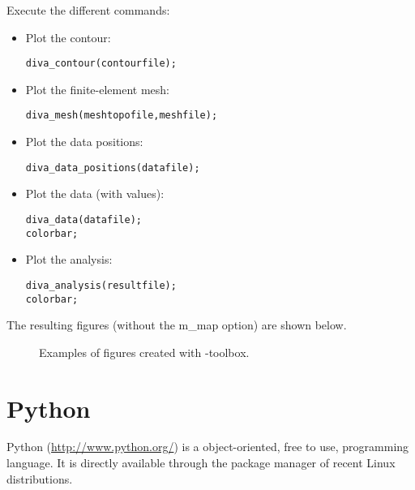 Execute the different commands:
\begin{itemize}
\item Plot the contour:
\begin{lstlisting}[style=Matlab]
diva_contour(contourfile);
\end{lstlisting}

\item Plot the finite-element mesh:
\begin{lstlisting}[style=Matlab]
diva_mesh(meshtopofile,meshfile);
\end{lstlisting}


\item Plot the data positions:
\begin{lstlisting}[style=Matlab]
diva_data_positions(datafile);
\end{lstlisting}

\item Plot the data (with values):
\begin{lstlisting}[style=Matlab]
diva_data(datafile);
colorbar;
\end{lstlisting}

\item Plot the analysis:
\begin{lstlisting}[style=Matlab]
diva_analysis(resultfile);
colorbar;
\end{lstlisting}


\end{itemize}



The resulting figures (without the m\_map option) are shown below.

\begin{figure}[H]
\centering
{}
\caption{Examples of figures created with \diva-\matlab toolbox.}
\end{figure}





\section{Python}


Python (\url{http://www.python.org/}) is a object-oriented, free to use, programming language. It is directly available through the package manager of recent Linux distributions.

